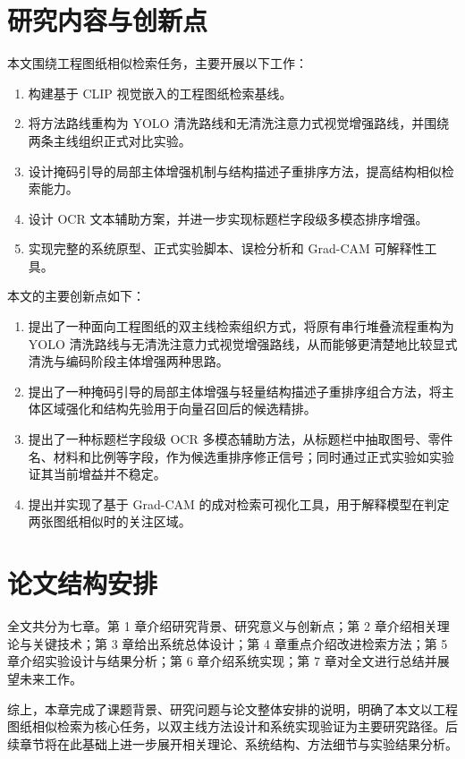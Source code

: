 \section{研究内容与创新点}

本文围绕工程图纸相似检索任务，主要开展以下工作：

\begin{enumerate}
  \item 构建基于 CLIP 视觉嵌入的工程图纸检索基线。
  \item 将方法路线重构为 YOLO 清洗路线和无清洗注意力式视觉增强路线，并围绕两条主线组织正式对比实验。
  \item 设计掩码引导的局部主体增强机制与结构描述子重排序方法，提高结构相似检索能力。
  \item 设计 OCR 文本辅助方案，并进一步实现标题栏字段级多模态排序增强。
  \item 实现完整的系统原型、正式实验脚本、误检分析和 Grad-CAM 可解释性工具。
\end{enumerate}

本文的主要创新点如下：

\begin{enumerate}
  \item 提出了一种面向工程图纸的双主线检索组织方式，将原有串行堆叠流程重构为 YOLO 清洗路线与无清洗注意力式视觉增强路线，从而能够更清楚地比较显式清洗与编码阶段主体增强两种思路。
  \item 提出了一种掩码引导的局部主体增强与轻量结构描述子重排序组合方法，将主体区域强化和结构先验用于向量召回后的候选精排。
  \item 提出了一种标题栏字段级 OCR 多模态辅助方法，从标题栏中抽取图号、零件名、材料和比例等字段，作为候选重排序修正信号；同时通过正式实验如实验证其当前增益并不稳定。
  \item 提出并实现了基于 Grad-CAM 的成对检索可视化工具，用于解释模型在判定两张图纸相似时的关注区域。
\end{enumerate}

\section{论文结构安排}

全文共分为七章。第 1 章介绍研究背景、研究意义与创新点；第 2 章介绍相关理论与关键技术；第 3 章给出系统总体设计；第 4 章重点介绍改进检索方法；第 5 章介绍实验设计与结果分析；第 6 章介绍系统实现；第 7 章对全文进行总结并展望未来工作。

综上，本章完成了课题背景、研究问题与论文整体安排的说明，明确了本文以工程图纸相似检索为核心任务，以双主线方法设计和系统实现验证为主要研究路径。后续章节将在此基础上进一步展开相关理论、系统结构、方法细节与实验结果分析。
